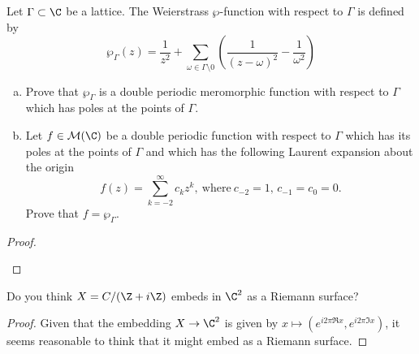 \documentclass[10pt]{amsart}
\begin{document}
\begin{thm}
  Let $\Gamma \subset \C$ be a lattice.
  The Weierstrass $\wp$-function with respect to $\Gamma$ is defined by
  $$\wp_\Gamma (z) = \frac{1}{z^2} + \sum_{\omega \in \Gamma \setminus 0} \left( \frac{1}{(z - \omega)^2} - \frac{1}{\omega^2}\right)$$
  
  \begin{enumerate}[(a)]
  \item
    Prove that $\wp_\Gamma$ is a double periodic meromorphic function with respect to $\Gamma$ which has poles at the points of $\Gamma$.
  \item
    Let $f \in \mathcal{M}(\C)$ be a double periodic function with respect to $\Gamma$ which has its poles at the points of $\Gamma$ and which has the following Laurent expansion about the origin
    $$f(z) = \sum_{k = -2}^\infty c_kz^k,\ \text{where}\ c_{-2} = 1,\, c_{-1} = c_0 = 0.$$
    Prove that $f = \wp_\Gamma$.
  \end{enumerate}
  
  \begin{proof}
    \begin{enumerate}[(a)]
  \end{enumerate}
  \end{proof}
\end{thm}

\begin{thm}
  Do you think $X = C/(\Z + i\Z)$ embeds in $\C^2$ as a Riemann surface?

  \begin{proof}
    Given that the embedding $X \rightarrow \C^2$ is given by $x \mapsto (e^{i2\pi\Re{x}}, e^{i2\pi\Im{x}})$, it seems reasonable to think that it might embed as a Riemann surface.
  \end{proof}
\end{thm}
\end{document}
